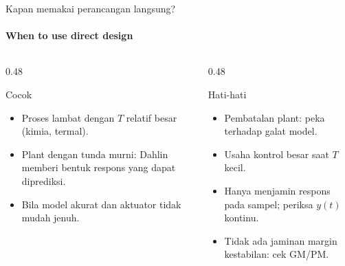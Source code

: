 \documentclass[aspectratio=169,10pt]{beamer}
\begin{document}
\begin{frame}{Kapan memakai perancangan langsung?}
	\framesubtitle{When to use direct design}
	\begin{columns}[T]
		\begin{column}{0.48\textwidth}
			\begin{exampleblock}{Cocok}
				\small
				\begin{itemize}
					\item Proses lambat dengan $T$ relatif besar (kimia, termal).
					\item Plant dengan tunda murni: Dahlin memberi bentuk respons yang dapat diprediksi.
					\item Bila model akurat dan aktuator tidak mudah jenuh.
				\end{itemize}
			\end{exampleblock}
		\end{column}
		\begin{column}{0.48\textwidth}
			\begin{alertblock}{Hati-hati}
				\small
				\begin{itemize}
					\item Pembatalan plant: peka terhadap galat model.
					\item Usaha kontrol besar saat $T$ kecil.
					\item Hanya menjamin respons pada sampel; periksa $y(t)$ kontinu.
					\item Tidak ada jaminan margin kestabilan: cek GM/PM.
				\end{itemize}
			\end{alertblock}
		\end{column}
	\end{columns}
\end{frame}
\end{document}
